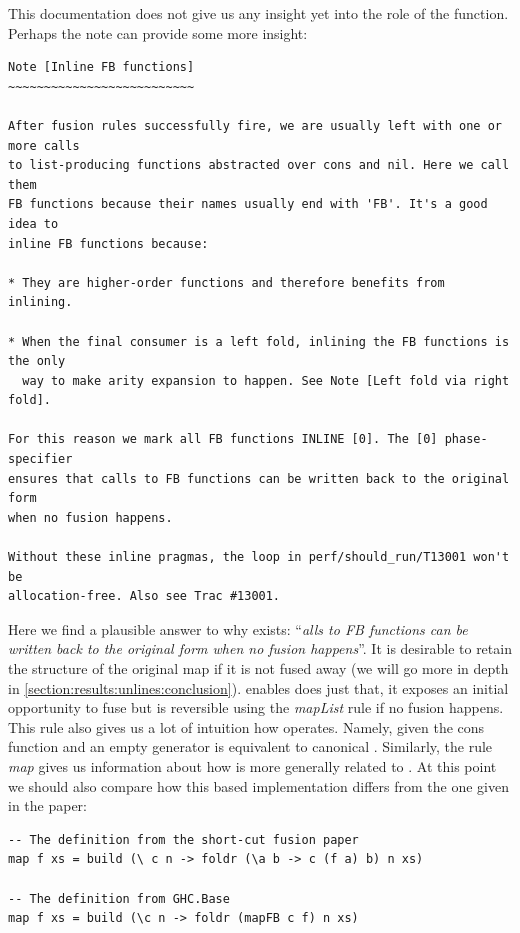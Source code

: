 This documentation does not give us any insight yet into the role of the  function. Perhaps the note  can provide
some more insight:

\begin{listing}[H]
\begin{verbatim}
Note [Inline FB functions]
~~~~~~~~~~~~~~~~~~~~~~~~~~

After fusion rules successfully fire, we are usually left with one or more calls
to list-producing functions abstracted over cons and nil. Here we call them
FB functions because their names usually end with 'FB'. It's a good idea to
inline FB functions because:

* They are higher-order functions and therefore benefits from inlining.

* When the final consumer is a left fold, inlining the FB functions is the only
  way to make arity expansion to happen. See Note [Left fold via right fold].

For this reason we mark all FB functions INLINE [0]. The [0] phase-specifier
ensures that calls to FB functions can be written back to the original form
when no fusion happens.

Without these inline pragmas, the loop in perf/should_run/T13001 won't be
allocation-free. Also see Trac #13001.
\end{verbatim}
\end{listing}

Here we find a plausible answer to why  exists: ``\textit{alls to FB functions can be written back to the original form
when no fusion happens}''. It is desirable to retain the structure of the original map if it is not fused away (we will go more in depth in \cref{section:results:unlines:conclusion}).
 enables does just that,
it exposes an initial opportunity to fuse but is reversible using the \textit{mapList} rule if no fusion happens. This rule also gives us a lot of
intuition how  operates. Namely, given the cons function and an empty generator is equivalent to canonical . 
Similarly, the rule \textit{map} gives us information about how  is more generally related to . At this point we should
also compare how this  based implementation differs from the one given in the paper:

\begin{listing}[H]
\begin{verbatim}
-- The definition from the short-cut fusion paper
map f xs = build (\ c n -> foldr (\a b -> c (f a) b) n xs)

-- The definition from GHC.Base
map f xs = build (\c n -> foldr (mapFB c f) n xs)
\end{verbatim}
\end{listing}

